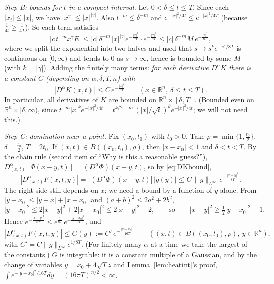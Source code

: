 \documentclass[11pt]{article}
\theoremstyle{plain}
\theoremstyle{definition}
\theoremstyle{remark}
\begin{document}
\emph{Step B: bounds for $t$ in a compact interval.} Let $0 < \delta \leq t \leq T$. Since each $|x_i| \leq |x|$, we have $|x^\gamma| \leq |x|^{|\gamma|}$. Also $t^{-m} \leq \delta^{-m}$ and $e^{-|x|^2/4t} \leq e^{-|x|^2/4T}$ (because $\frac{1}{4t} \geq \frac{1}{4T}$). So each term satisfies
$$ |c\, t^{-m}x^\gamma E| \leq |c|\,\delta^{-m}\,|x|^{|\gamma|}e^{-\frac{|x|^2}{8T}}\cdot e^{-\frac{|x|^2}{8T}} \leq |c|\,\delta^{-m}M\, e^{-\frac{|x|^2}{8T}}, $$
where we split the exponential into two halves and used that $s \mapsto s^{k}e^{-s^2/8T}$ is continuous on $[0,\infty)$ and tends to $0$ as $s \to \infty$, hence is bounded by some $M$ (with $k = |\gamma|$). Adding the finitely many terms: \emph{for each derivative $D^\alpha K$ there is a constant $C$ (depending on $\alpha, \delta, T, n$) with}
\begin{equation}\label{eq:DKbound}
|D^\alpha K(x,t)| \leq C\, e^{-\frac{|x|^2}{8T}} \qquad (x \in \mathbb{R}^n,\ \delta \leq t \leq T).
\end{equation}
In particular, all derivatives of $K$ are bounded on $\mathbb{R}^n \times [\delta,T]$. (Bounded even on $\mathbb{R}^n \times [\delta,\infty)$, since $t^{-m}|x|^ke^{-|x|^2/4t} = t^{k/2-m}\,(|x|/\sqrt t)^ke^{-|x|^2/4t}$; we will not need this.)

\emph{Step C: domination near a point.} Fix $(x_0,t_0)$ with $t_0 > 0$. Take $\rho = \min\{1, \frac{t_0}{2}\}$, $\delta = \frac{t_0}{2}$, $T = 2t_0$. If $(x,t) \in B((x_0,t_0),\rho)$, then $|x - x_0| < 1$ and $\delta < t < T$. By the chain rule (second item of ``Why is this a reasonable guess?''), $D^\alpha_{(x,t)}[\Phi(x-y,t)] = (D^\alpha\Phi)(x - y,t)$, so by \eqref{eq:DKbound},
$$ |D^\alpha_{(x,t)}F(x,t,y)| = |(D^\alpha\Phi)(x-y,t)|\,|g(y)| \leq C\,\|g\|_{L^\infty}\, e^{-\frac{|x-y|^2}{8T}}. $$
The right side still depends on $x$; we need a bound by a function of $y$ alone. From $|y - x_0| \leq |y - x| + |x - x_0|$ and $(a + b)^2 \leq 2a^2 + 2b^2$,
$$ |y - x_0|^2 \leq 2|x - y|^2 + 2|x - x_0|^2 \leq 2|x-y|^2 + 2, \qquad\text{so}\qquad |x - y|^2 \geq \tfrac12|y - x_0|^2 - 1. $$
Hence $e^{-\frac{|x-y|^2}{8T}} \leq e^{\frac{1}{8T}}\,e^{-\frac{|y-x_0|^2}{16T}}$, and
$$ |D^\alpha_{(x,t)}F(x,t,y)| \leq G(y) := C'\, e^{-\frac{|y-x_0|^2}{16T}} \qquad ((x,t) \in B((x_0,t_0),\rho),\ y \in \mathbb{R}^n), $$
with $C' = C\|g\|_{L^\infty}e^{1/8T}$. (For finitely many $\alpha$ at a time we take the largest of the constants.) $G$ is integrable: it is a constant multiple of a Gaussian, and by the change of variables $y = x_0 + 4\sqrt T z$ and Lemma~\ref{lem:heatint}'s proof, $\int e^{-|y - x_0|^2/16T}dy = (16\pi T)^{n/2} < \infty$.
\end{document}
